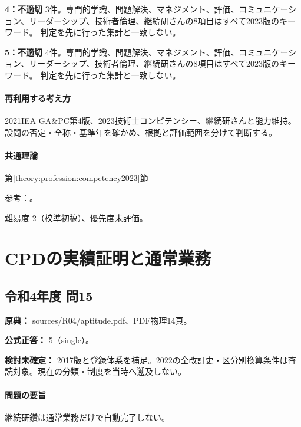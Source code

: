 \noindent\textbf{4：不適切} 3件。専門的学識、問題解決、マネジメント、評価、コミュニケーション、リーダーシップ、技術者倫理、継続研さんの8項目はすべて2023版のキーワード。 判定を先に行った集計と一致しない。\par

\noindent\textbf{5：不適切} 4件。専門的学識、問題解決、マネジメント、評価、コミュニケーション、リーダーシップ、技術者倫理、継続研さんの8項目はすべて2023版のキーワード。 判定を先に行った集計と一致しない。\par

\paragraph{再利用する考え方} 2021IEA GA\&PC第4版、2023技術士コンピテンシー、継続研さんと能力維持。 設問の否定・全称・基準年を確かめ、根拠と評価範囲を分けて判断する。

\paragraph{共通理論} \hyperref[theory:profession:competency2023]{第\ref*{theory:profession:competency2023}節}

\par 参考：\cite{eth54_competency2023}。

\par 難易度 2（校準初稿）、優先度未評価。

\section{CPDの実績証明と通常業務}

\subsection{令和4年度 問15}
\label{q:r04-reg-apt-15}

\noindent\textbf{原典：} sources/R04/aptitude.pdf、PDF物理14頁。

\textbf{公式正答：} 5（single）。

\par\textbf{検討未確定：} 2017版と登録体系を補足。2022の全改訂史・区分別換算条件は査読対象。現在の分類・制度を当時へ遡及しない。

\paragraph{問題の要旨} 継続研鑽は通常業務だけで自動完了しない。

